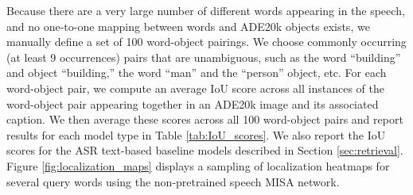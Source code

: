 Because there are a very large number of different words appearing in the speech, and no one-to-one mapping between words and ADE20k objects exists, we manually define a set of 100 word-object pairings. We choose commonly occurring (at least 9 occurrences) pairs that are unambiguous, such as the word ``building'' and object ``building,'' the word ``man'' and the ``person'' object, etc. For each word-object pair, we compute an average IoU score across all instances of the word-object pair appearing together in an ADE20k image and its associated caption. We then average these scores across all 100 word-object pairs and report results for each model type in Table \ref{tab:IoU_scores}. We also report the IoU scores for the ASR text-based baseline models described in Section \ref{sec:retrieval}. Figure \ref{fig:localization_maps} displays a sampling of localization heatmaps for several query words using the non-pretrained speech MISA network.


